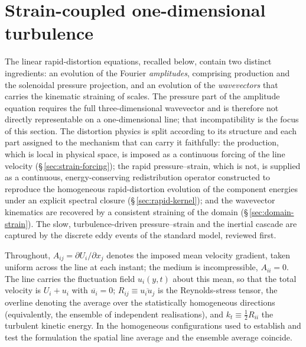 \documentclass[lineno]{JFM-FLM_Au}
\begin{document}
\section{Strain-coupled one-dimensional turbulence}\label{sec:formulation}

The linear rapid-distortion equations, recalled below, contain two
distinct ingredients: an evolution of the Fourier \emph{amplitudes},
comprising production and the solenoidal pressure projection, and an
evolution of the \emph{wavevectors} that carries the kinematic straining
of scales. The pressure part of the amplitude equation requires the full
three-dimensional wavevector and is therefore not directly representable
on a one-dimensional line; that incompatibility is the focus of this section.
The distortion physics is split according to its structure and each part
assigned to the mechanism that can carry it faithfully: the production,
which is local in physical space, is imposed as a continuous forcing of
the line velocity (\S\,\ref{sec:strain-forcing}); the rapid
pressure--strain, which is not, is supplied as a continuous,
energy-conserving redistribution operator constructed to reproduce the
homogeneous rapid-distortion evolution of the component energies under an
explicit spectral closure (\S\,\ref{sec:rapid-kernel}); and the wavevector
kinematics are recovered by a consistent straining of the domain
(\S\,\ref{sec:domain-strain}). The slow, turbulence-driven pressure--strain and the inertial cascade
are captured by the discrete eddy events of the standard model, reviewed first.

Throughout, $A_{ij}=\partial U_i/\partial x_j$ denotes the imposed mean
velocity gradient, taken uniform across the line at each instant; the
medium is incompressible, $A_{ii}=0$. The line carries the fluctuation
field $u_i(y,t)$ about this mean, so that the total velocity is
$U_i+u_i$ with $\overline{u_i}=0$; $R_{ij}\equiv\overline{u_iu_j}$ is the
Reynolds-stress tensor, the overline denoting the average over the
statistically homogeneous directions (equivalently, the ensemble of
independent realisations), and $k_t\equiv\tfrac12R_{ii}$ the turbulent
kinetic energy. In the homogeneous configurations used to establish and
test the formulation the spatial line average and the ensemble average
coincide.
\end{document}
